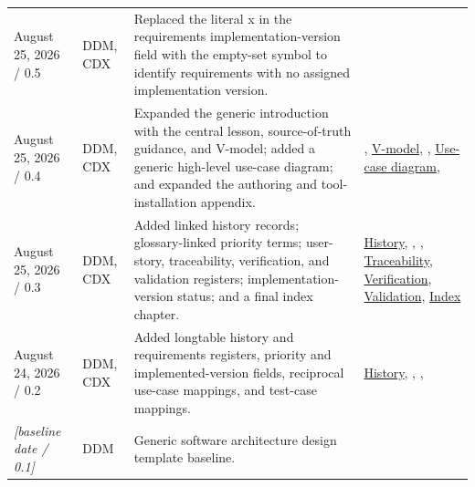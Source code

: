 \begin{tabularx}{\linewidth}{L{3.1cm}L{2.2cm}YL{2.5cm}}
August 25, 2026 / 0.5 & DDM, CDX & Replaced the literal x in the requirements implementation-version field with the empty-set symbol to identify requirements with no assigned implementation version. & \\
August 25, 2026 / 0.4 & DDM, CDX & Expanded the generic introduction with the central lesson, source-of-truth guidance, and V-model; added a generic high-level use-case diagram; and expanded the authoring and tool-installation appendix. & , \hyperref[Figure:VModel]{V-model}, , \hyperref[Figure:UseCaseDiagram]{Use-case diagram}, \\
August 25, 2026 / 0.3 & DDM, CDX & Added linked history records; glossary-linked priority terms; user-story, traceability, verification, and validation registers; implementation-version status; and a final index chapter. & \hyperref[Table:DocumentHistory]{History}, , , \hyperref[Table:TraceabilityMatrix]{Traceability}, \hyperref[Table:VerificationRegister]{Verification}, \hyperref[Table:ValidationRegister]{Validation}, \hyperref[Chapter:Index]{Index}\\
August 24, 2026 / 0.2 & DDM, CDX & Added longtable history and requirements registers, priority and implemented-version fields, reciprocal use-case mappings, and test-case mappings. & \hyperref[Table:DocumentHistory]{History}, , , \\
\textit{[baseline date / 0.1]} & DDM & Generic software architecture design template baseline. & \\
\end{tabularx}
